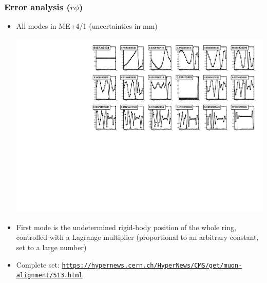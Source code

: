 \documentclass[compress]{beamer}
\begin{document}
\begin{frame}
\frametitle{Error analysis ($r\phi$)}

\begin{itemize}
\item All modes in ME+4/1 (uncertainties in mm)

\includegraphics[width=\linewidth]{errormodes_pgnormal_p41.pdf}

\item First mode is the undetermined rigid-body position of the whole
  ring, controlled with a Lagrange multiplier (proportional to an
  arbitrary constant, set to a large number)

\item Complete set: \href{https://hypernews.cern.ch/HyperNews/CMS/get/muon-alignment/513.html}{\tt \tiny https://hypernews.cern.ch/HyperNews/CMS/get/muon-alignment/513.html}
\end{itemize}
\end{frame}
\end{document}
